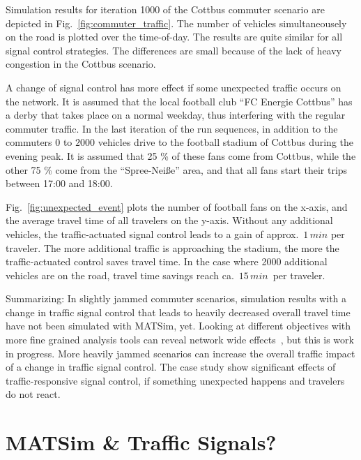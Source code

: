 Simulation results for iteration 1000 of the Cottbus commuter scenario are depicted in
Fig.~\ref{fig:commuter_traffic}. 
The number of vehicles simultaneousely on the road is plotted over the time-of-day. 
The results are quite similar for all signal control strategies. 
The differences are small because of the lack of heavy congestion in the Cottbus scenario. 

A change of signal control has more effect if some unexpected traffic occurs on the network. 
It is assumed that the local football club ``FC Energie Cottbus'' has a derby that takes place on a normal weekday, thus interfering with the regular commuter traffic. 
In the last iteration of the run sequences, in addition to the commuters $0$ to $2000$ vehicles drive to the football stadium of Cottbus during the evening peak. 
It is assumed that 25 \% of these fans come from Cottbus,
while the other 75 \% come from the ``Spree-Nei{\ss}e'' area, and that all fans start their trips between 17:00 and 18:00. 

Fig.~\ref{fig:unexpected_event} plots the number of football fans on
the x-axis, and the average travel time of all travelers on the
y-axis. Without any additional vehicles,
the traffic-actuated signal control leads to a gain of
approx.~$1 \, min$ per traveler.
The more additional traffic is approaching the stadium, the more the traffic-actuated control saves travel time. In the case where 2000 additional vehicles are on the road, travel time savings reach ca.~$15\, min$~per traveler. 

Summarizing: In slightly jammed commuter scenarios, simulation results with a change in traffic signal control that leads to heavily decreased overall travel time have not been simulated with MATSim, yet. 
Looking at different objectives with more fine grained analysis tools can reveal network wide effects~\citep[e.g.~see the analysis using macroscopic fundamental diagrams, pp.114]{Grether2014PhD}, but this is work in progress.  
More heavily jammed scenarios can increase the overall traffic impact of a change in traffic signal control. The case study show significant effects of traffic-responsive signal control, if something unexpected happens and travelers do not react.  

\section{MATSim \& Traffic Signals?}

